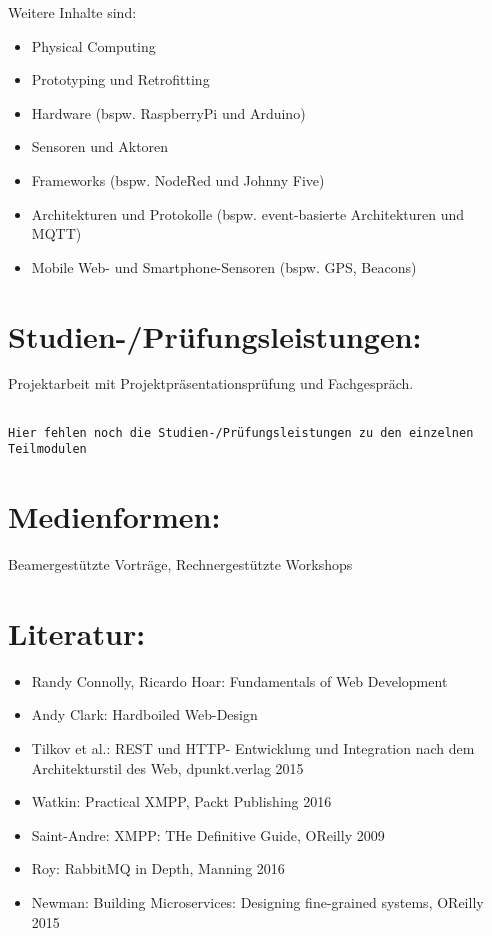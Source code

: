Weitere Inhalte sind:

\begin{itemize}
\item
  Physical Computing
\item
  Prototyping und Retrofitting
\item
  Hardware (bspw. RaspberryPi und Arduino)
\item
  Sensoren und Aktoren
\item
  Frameworks (bspw. NodeRed und Johnny Five)
\item
  Architekturen und Protokolle (bspw. event-basierte Architekturen und
  MQTT)
\item
  Mobile Web- und Smartphone-Sensoren (bspw. GPS, Beacons)
\end{itemize}

\section*{Studien-/Prüfungsleistungen:}\label{studien-pruxfcfungsleistungen-25}

Projektarbeit mit Projektpräsentationsprüfung und Fachgespräch.

\begin{verbatim}

Hier fehlen noch die Studien-/Prüfungsleistungen zu den einzelnen Teilmodulen
\end{verbatim}

\section*{Medienformen:}\label{medienformen-19}

Beamergestützte Vorträge, Rechnergestützte Workshops

\section*{Literatur:}\label{literatur-26}

\begin{itemize}
\item
  Randy Connolly, Ricardo Hoar: Fundamentals of Web Development
\item
  Andy Clark: Hardboiled Web-Design
\item
  Tilkov et al.: REST und HTTP- Entwicklung und Integration nach dem
  Architekturstil des Web, dpunkt.verlag 2015
\item
  Watkin: Practical XMPP, Packt Publishing 2016
\item
  Saint-Andre: XMPP: THe Definitive Guide, OReilly 2009
\item
  Roy: RabbitMQ in Depth, Manning 2016
\item
  Newman: Building Microservices: Designing fine-grained systems,
  OReilly 2015
\end{itemize}

